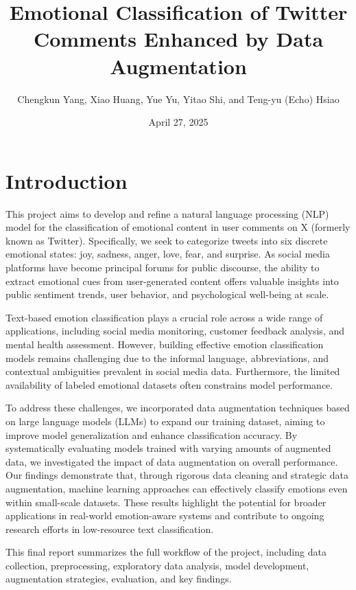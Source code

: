\documentclass{article}
\title{Emotional Classification of Twitter Comments Enhanced by Data Augmentation}
\author{Chengkun Yang, Xiao Huang, Yue Yu, Yitao Shi, and Teng-yu (Echo) Hsiao}
\date{April 27, 2025}
\begin{document}
\maketitle

\section{Introduction}

This project aims to develop and refine a natural language processing (NLP) model for the classification of emotional content in user comments on X (formerly known as Twitter). Specifically, we seek to categorize tweets into six discrete emotional states: joy, sadness, anger, love, fear, and surprise. As social media platforms have become principal forums for public discourse, the ability to extract emotional cues from user-generated content offers valuable insights into public sentiment trends, user behavior, and psychological well-being at scale.

Text-based emotion classification plays a crucial role across a wide range of applications, including social media monitoring, customer feedback analysis, and mental health assessment. However, building effective emotion classification models remains challenging due to the informal language, abbreviations, and contextual ambiguities prevalent in social media data. Furthermore, the limited availability of labeled emotional datasets often constrains model performance.

To address these challenges, we incorporated data augmentation techniques based on large language models (LLMs) to expand our training dataset, aiming to improve model generalization and enhance classification accuracy. By systematically evaluating models trained with varying amounts of augmented data, we investigated the impact of data augmentation on overall performance. Our findings demonstrate that, through rigorous data cleaning and strategic data augmentation, machine learning approaches can effectively classify emotions even within small-scale datasets. These results highlight the potential for broader applications in real-world emotion-aware systems and contribute to ongoing research efforts in low-resource text classification.

This final report summarizes the full workflow of the project, including data collection, preprocessing, exploratory data analysis, model development, augmentation strategies, evaluation, and key findings.
\end{document}
